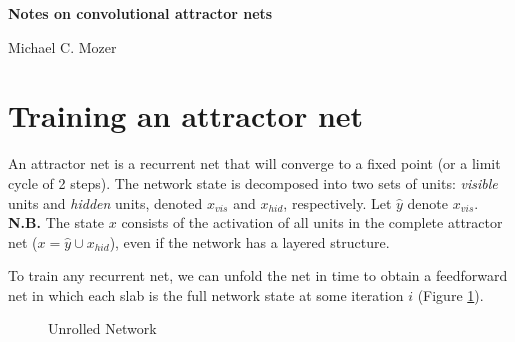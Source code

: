 \documentclass[11pt,letterpaper]{article}
\theoremstyle{definition}
\newcommand{\yhat}{\hat{y}}
\begin{document}
\begin{center}

{\Large \textbf{Notes on convolutional attractor nets}}

\vspace{1em}
Michael C. Mozer

\end{center}




\section{Training an attractor net}

An attractor net is a recurrent net that will converge to a fixed point
(or a limit cycle of 2 steps). The network state is decomposed into two sets of units: \textit{visible} units and \textit{hidden} units, denoted $x_{vis}$ and $x_{hid}$, respectively. Let $\yhat$ denote $x_{vis}$. \textbf{N.B.} The state $x$ consists of the activation of all units in the complete attractor net ($x = \yhat \cup x_{hid}$), even if the network has a layered structure.

To train any recurrent net, we can unfold
the net in time to obtain a feedforward net in which each slab is
the full network state at some iteration $i$ (Figure \ref{fig:unrolled_net}).

\begin{figure}[!h]
\centering
{}
\caption{Unrolled Network}
\label{fig:unrolled_net}
\end{figure}
\end{document}
